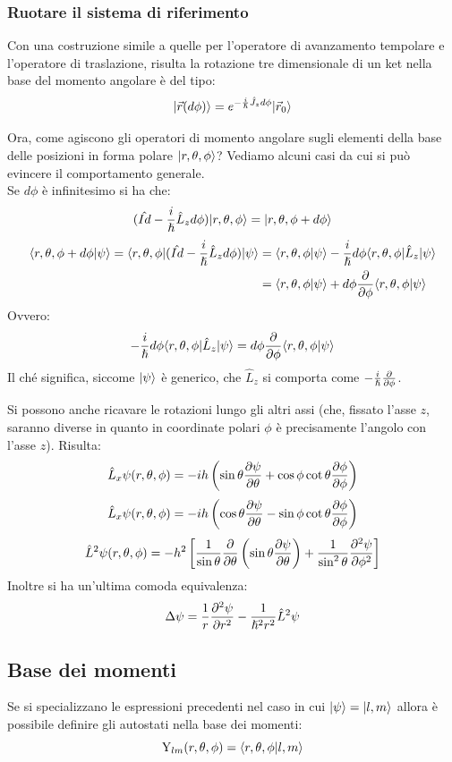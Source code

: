 \subsubsection*{Ruotare il sistema di riferimento}
Con una costruzione simile a quelle per l'operatore di avanzamento tempolare e l'operatore di traslazione, risulta la rotazione tre dimensionale di un ket nella base del momento angolare è del tipo:
\[
    \Ket{\vec r(d\phi)} = e^{-\frac{i}{\h}\hat J_z d\phi} \Ket{\vec r_0}
\]

Ora, come agiscono gli operatori di momento angolare sugli elementi della base delle posizioni in forma polare $\Ket{r, \theta, \phi}$? Vediamo alcuni casi da cui si può evincere il comportamento generale.\\
Se $d\phi$ è infinitesimo si ha che:
\[
    (\Id - \frac{i}{\h}\hat L_z d\phi) \Ket{r, \theta, \phi} = \Ket{r, \theta, \phi + d\phi}
\]
\begin{align*}
    \braket{r, \theta, \phi + d\phi}{\psi} = \Bra{r, \theta, \phi} (\Id - \frac{i}{\h}\hat L_z d\phi) \Ket \psi &= \braket{r, \theta, \phi}{\psi} - \frac{i}{\h}d\phi \Bra{r, \theta, \phi} \hat L_z  \Ket \psi \\
    &= \braket{r, \theta, \phi}{\psi} + d\phi\deriv[\phi]{} \braket{r, \theta, \phi}{\psi}
\end{align*}
Ovvero:
\[
    -\frac{i}{\h} d\phi\Bra{r, \theta, \phi} \hat L_z \Ket \psi = d\phi\deriv[\phi]{} \braket{r, \theta, \phi}{\psi}
\]
Il ché significa, siccome $\Ket \psi$ è generico, che $\hat L_z$ si comporta come $-\frac{i}{\h}\deriv[\phi]{}$.

Si possono anche ricavare le rotazioni lungo gli altri assi (che, fissato l'asse $z$, saranno diverse in quanto in coordinate polari $\phi$ è precisamente l'angolo con l'asse $z$). Risulta:
\[
    \hat L_x \psi(r, \theta, \phi) = -ih\l \sin \theta \deriv[\theta]{\psi} + \cos\phi\cot\theta \deriv[\phi]{\phi} \r \]\[
    \hat L_x \psi(r, \theta, \phi) = -ih\l \cos \theta \deriv[\theta]{\psi} - \sin\phi\cot\theta \deriv[\phi]{\phi} \r \]\[
    \hat L^2 \psi(r, \theta, \phi) = -h^2\left[ \inv{\sin \theta} \deriv[\theta]{}\l \sin\theta \deriv[\theta]{\psi} \r + \inv{\sin^2 \theta} \sderiv[\phi]{\psi} \right]
\]
Inoltre si ha un'ultima comoda equivalenza:
\[
    \Lap \psi = \inv{r} \sderiv[r]{\psi} - \inv{\h^2 r^2} \hat L^2 \psi
\]

\subsection{Base dei momenti}
Se si specializzano le espressioni precedenti nel caso in cui $\Ket \psi = \Ket {l,m}$ allora è possibile definire gli autostati nella base dei momenti:
\[
    \Y_{lm}(r,\theta,\phi) = \braket{r,\theta,\phi}{l,m}
\]

